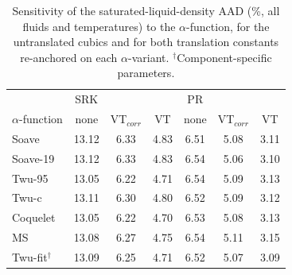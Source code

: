 \begin{table}[H]
\centering
\caption{Sensitivity of the saturated-liquid-density AAD (\%, all fluids and temperatures) to the $\alpha$-function, for the untranslated cubics and for both translation constants re-anchored on each $\alpha$-variant. $^{\dagger}$Component-specific parameters.}
\label{tab:tabS_vt_alpha}
\small
\begin{tabular}{lcccccc}
\toprule
 & SRK &  &  & PR &  &  \\
$\alpha$-function & none & VT$_{corr}$ & VT & none & VT$_{corr}$ & VT \\
\midrule
Soave & 13.12 & 6.33 & 4.83 & 6.51 & 5.08 & 3.11 \\
Soave-19 & 13.12 & 6.33 & 4.83 & 6.54 & 5.06 & 3.10 \\
Twu-95 & 13.05 & 6.22 & 4.71 & 6.54 & 5.09 & 3.13 \\
Twu-c & 13.11 & 6.30 & 4.80 & 6.52 & 5.09 & 3.12 \\
Coquelet & 13.05 & 6.22 & 4.70 & 6.53 & 5.08 & 3.13 \\
MS & 13.08 & 6.27 & 4.75 & 6.54 & 5.11 & 3.15 \\
Twu-fit$^{\dagger}$ & 13.09 & 6.25 & 4.71 & 6.52 & 5.07 & 3.09 \\
\bottomrule
\end{tabular}
\end{table}
